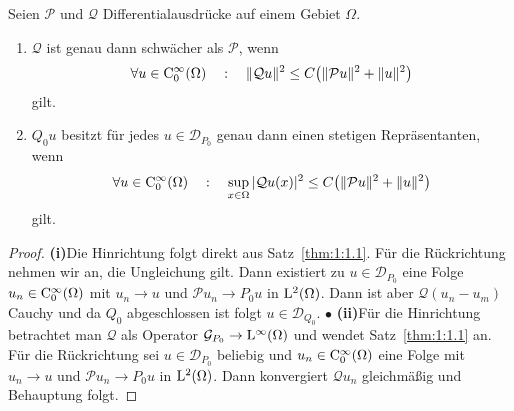 \begin{lem}\label{lm: Qu stetig}
Seien $\mathcal P$ und $\mathcal Q$ Differentialausdr\"ucke auf einem Gebiet $\Omega$. 
\begin{enumerate}
\item%
$\mathcal Q$ ist genau dann schwächer als $\mathcal P$, wenn
\begin{equation}\label{eq:1:1.21}
    \forall u\in\mathrm C^\infty_0(\Omega)\quad:\quad \|\mathcal Qu\|^2 \le C \big( \|\mathcal Pu\|^2 + \|u\|^2 \big)
\end{equation}
gilt.
\item%
$Q_0 u$ besitzt für jedes $u\in\mathcal D_{P_0}$ genau dann einen stetigen Repräsentanten, wenn
\begin{equation}
    \forall u\in\mathrm C^\infty_0(\Omega)\quad:\quad  \sup_{x\in\Omega} |\mathcal Qu(x) |^2 \le C \big( \|\mathcal Pu\|^2 + \|u\|^2 \big)
\end{equation}
gilt.
\end{enumerate}
\end{lem}
\begin{proof}
{\bf (i)}\quad Die Hinrichtung folgt direkt aus Satz~\ref{thm:1:1.1}. Für die Rückrichtung nehmen wir an, die Ungleichung gilt. Dann existiert zu $u\in\mathcal D_{P_0}$ eine Folge $u_n\in\mathrm C_0^\infty(\Omega)$ mit $u_n\to u$ und $\mathcal P u_n\to P_0 u$ in $\mathrm L^2(\Omega)$. Dann ist aber $\mathcal Q(u_n-u_m)$ Cauchy und da $Q_0$ abgeschlossen ist folgt $u\in\mathcal D_{Q_0}$. $\bullet$\qquad
{\bf (ii)}\quad Für die Hinrichtung betrachtet man $\mathcal Q$ als Operator $\mathcal G_{P_0}\to\mathrm L^\infty(\Omega)$ und wendet Satz~\ref{thm:1:1.1} an. Für die Rückrichtung sei $u\in\mathcal D_{P_0}$ beliebig und $u_n\in\mathrm C_0^\infty(\Omega)$ eine Folge mit $u_n\to u$ und $\mathcal Pu_n\to P_0u$ in $\mathrm L^2(\Omega)$.
Dann konvergiert $\mathcal Qu_n$ gleichmäßig und Behauptung folgt.
\end{proof}

